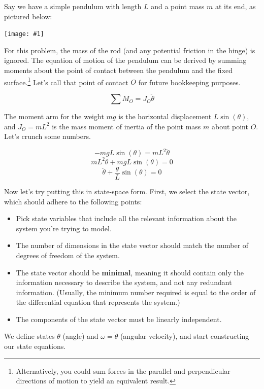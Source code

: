 \documentclass{report}
\newcommand{\bicture}[1]{
\begin{center}
    {\texttt{[image: \#1]}}
\end{center}}
\begin{document}
\begin{onehalfspacing}
\begin{flushleft}
\medskip

Say we have a simple pendulum with length \(L\) and a point mass \(m\) at its end, as pictured below:

\bicture{8_pend}

For this problem, the mass of the rod (and any potential friction in the hinge) is ignored. The equation of motion of the pendulum can be derived by summing moments about the point of contact between the pendulum and the fixed surface.\footnote{Alternatively, you could sum forces in the parallel and perpendicular directions of motion to yield an equivalent result.} Let's call that point of contact \(O\) for future bookkeeping purposes.

\vspace{-0.1in}
\[\sum{M_O} = J_O \ddot{\theta}\]

The moment arm for the weight \(mg\) is the horizontal displacement \(L \sin(\theta)\), and \(J_O = mL^2\) is the mass moment of inertia of the point mass \(m\) about point \(O\). Let's crunch some numbers.

\vspace{-0.1in}
\[-mgL \sin(\theta) = mL^2 \ddot{\theta}\]
\[mL^2 \ddot{\theta} + mgL \sin(\theta) = 0\]
\[\ddot{\theta} + \frac{g}{L} \sin(\theta) = 0\]

Now let's try putting this in state-space form. First, we select the state vector, which should adhere to the following points:

\begin{itemize}[noitemsep]
    \item Pick state variables that include all the relevant information about the system you're trying to model.
    \item The number of dimensions in the state vector should match the number of degrees of freedom of the system.
    \item The state vector should be \textbf{minimal}, meaning it should contain only the information necessary to describe the system, and not any redundant information. (Usually, the minimum number required is equal to the order of the differential equation that represents the system.)
    \item The components of the state vector must be linearly independent.
\end{itemize}

We define states \(\theta\) (angle) and \(\omega = \dot{\theta}\) (angular velocity), and start constructing our state equations.


\end{flushleft}
\end{onehalfspacing}
\end{document}
